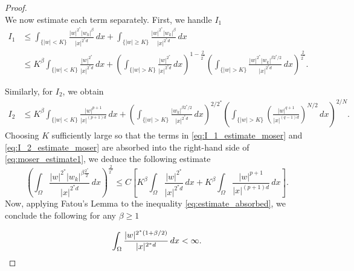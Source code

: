 \documentclass[10pt,a4paper]{amsart}
\newcommand{\om} {\Omega}
\begin{document}
\begin{proof}
\begin{equation}
\end{equation}
We now estimate each term separately. First, we handle \( I_1 \)
\begin{equation}\label{eq:I_1_estimate_moser}
\begin{aligned}
I_1 &\leq \int_{\{|w| < K\}} \frac{|w|^{2^*} |w_k|^\beta}{|x|^{2^* d}} \, dx 
+ \int_{\{|w| \geq K\}} \frac{|w|^{2^*} |w_k|^\beta}{|x|^{2^*d}} \, dx \\
&\leq K^\beta \int_{\{|w| < K\}} \frac{|w|^{2^*}}{|x|^{2^* d}} \, dx 
+ \left( \int_{\{|w| > K\}} \frac{|w|^{2^*}}{|x|^{2^* d}} \, dx \right)^{1 - \frac{2}{2^*}} 
\left( \int_{\{|w| > K\}} \frac{|w|^{2^*}|w_k|^{\beta 2^*/2}}{|x|^{2^* d}} \, dx \right)^{\frac{2}{2^*}}.
\end{aligned}
\end{equation}

Similarly, for \( I_2 \), we obtain
\begin{equation}\label{eq:I_2_estimate_moser}
\begin{aligned}
I_2 &\leq K^\beta \int_{\{|w| < K\}} \frac{|w|^{p + 1}}{|x|^{(p+1)d}} \, dx 
+ \left( \int_{\{|w| > K\}} \frac{|w_k|^{\beta 2^*/2}}{|x|^{2^* d}} \, dx \right)^{2/2^*}
\left( \int_{\{|w| > K\}} \left(\frac{|w|^{q + 1}}{|x|^{(q-1)d}} \right)^{N/2} \, dx \right)^{2/N}.
\end{aligned}
\end{equation}
Choosing \( K \) sufficiently large so that the terms in \eqref{eq:I_1_estimate_moser} and \eqref{eq:I_2_estimate_moser} are absorbed into the right-hand side of \eqref{eq:moser_estimate1}, we deduce the following estimate
\begin{equation}
\left( \int_{\Omega} \frac{|w|^{2^*} |w_k|^{\beta \frac{2^*}{2}}}{|x|^{2^* d}} \, dx \right)^{\frac{2}{2^*}}
\leq 
C \left[
K^\beta \int_{\Omega} \frac{|w|^{2^*}}{|x|^{2^* d}} \, dx 
+ K^\beta \int_{\om} \frac{|w|^{p + 1}}{|x|^{(p+1)d}} \, dx 
\right].
\label{eq:estimate_absorbed}
\end{equation}
Now, applying Fatou's Lemma to the inequality \eqref{eq:estimate_absorbed}, we conclude the following for any \( \beta \geq 1 \)

\begin{equation*}
\int_{\Omega} \frac{|w|^{2^*(1 + \beta/2)}}{|x|^{2^* d}} \, dx < \infty. \qedhere
\end{equation*}
\end{proof}
\end{document}
